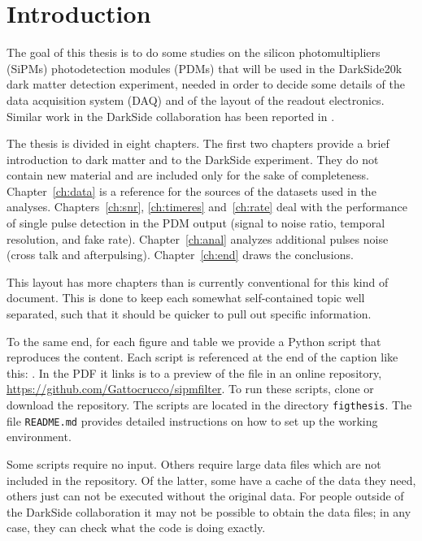 \chapter*{Introduction}

The goal of this thesis is to do some studies on the silicon photomultipliers
(SiPMs) photodetection modules (PDMs) that will be used in the DarkSide20k dark
matter detection experiment, needed in order to decide some details of the data
acquisition system (DAQ) and of the layout of the readout electronics. Similar
work in the DarkSide collaboration has been reported in
\cite[ch.~3,~5]{savarese2018}.


The thesis is divided in eight chapters. The first two chapters provide a brief
introduction to dark matter and to the DarkSide experiment. They do not contain
new material and are included only for the sake of completeness.
Chapter~\ref{ch:data} is a reference for the sources of the datasets used in
the analyses. Chapters~\ref{ch:snr}, \ref{ch:timeres} and~\ref{ch:rate} deal
with the performance of single pulse detection in the PDM output (signal to
noise ratio, temporal resolution, and fake rate). Chapter~\ref{ch:anal}
analyzes additional pulses noise (cross talk and afterpulsing).
Chapter~\ref{ch:end} draws the conclusions.

This layout has more chapters than is currently conventional for this kind of
document. This is done to keep each somewhat self-contained topic well
separated, such that it should be quicker to pull out specific information.

To the same end, for each figure and table we provide a Python script that
reproduces the content. Each script is referenced at the end of the caption
like this: . In the PDF it links is to a preview of the
file in an online repository, \url{https://github.com/Gattocrucco/sipmfilter}.
To run these scripts, clone or download the repository. The scripts are located
in the directory \nolinkurl{figthesis}. The file \nolinkurl{README.md} provides
detailed instructions on how to set up the working environment.

Some scripts require no input. Others require large data files which are not
included in the repository. Of the latter, some have a cache of the data they
need, others just can not be executed without the original data. For people
outside of the DarkSide collaboration it may not be possible to obtain the data
files; in any case, they can check what the code is doing exactly.

